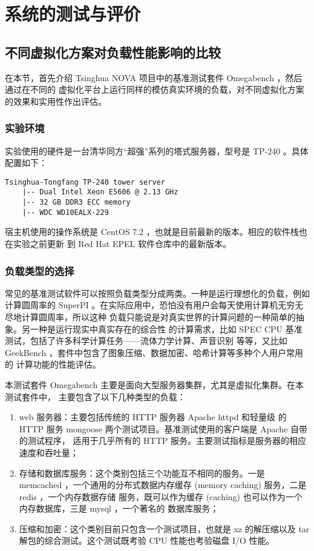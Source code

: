 \chapter{系统的测试与评价}

\section{不同虚拟化方案对负载性能影响的比较}

在本节，首先介绍 Tsinghua NOVA 项目中的基准测试套件 Omegabench ，然后通过在不同的
虚拟化平台上运行同样的模仿真实环境的负载，对不同虚拟化方案的效果和实用性作出评估。

\subsection{实验环境}

实验使用的硬件是一台清华同方“超强”系列的塔式服务器，型号是 TP-240 。具体配置如下：

\begin{lstlisting}
Tsinghua-Tongfang TP-240 tower server
    |-- Dual Intel Xeon E5606 @ 2.13 GHz
    |-- 32 GB DDR3 ECC memory
    |-- WDC WD10EALX-229
\end{lstlisting}

宿主机使用的操作系统是 CentOS 7.2 ，也就是目前最新的版本。相应的软件栈也在实验之前更新
到 Red Hat EPEL 软件仓库中的最新版本。

\subsection{负载类型的选择}

常见的基准测试软件可以按照负载类型分成两类。一种是运行理想化的负载，例如计算圆周率的
SuperPI 。在实际应用中，恐怕没有用户会每天使用计算机无穷无尽地计算圆周率，所以这种
负载只能说是对真实世界的计算问题的一种简单的抽象。另一种是运行现实中真实存在的综合性
的计算需求，比如 SPEC CPU 基准测试，包括了许多科学计算任务——流体力学计算、声音识别
等等，又比如 GeekBench ，套件中包含了图象压缩、数据加密、哈希计算等多种个人用户常用的
计算功能的性能评估。

本测试套件 Omegabench 主要是面向大型服务器集群，尤其是虚拟化集群。在本测试套件中，
主要包含了以下几种类型的负载：

\begin{enumerate}
    \item web 服务器：主要包括传统的 HTTP 服务器 Apache httpd 和轻量级
    的 HTTP 服务 mongoose 两个测试项目。基准测试使用的客户端是 Apache 自带的测试程序，
    适用于几乎所有的 HTTP 服务。主要测试指标是服务器的相应速度和吞吐量；
    \item 存储和数据库服务：这个类别包括三个功能互不相同的服务。一是 memcached
    ，一个通用的分布式数据内存缓存 (memory caching) 服务，二是 redis ，一个内存数据存储
    服务，既可以作为缓存 (caching) 也可以作为一个内存数据库，三是 mysql ，一个著名的
    数据库服务；
    \item 压缩和加密：这个类别目前只包含一个测试项目，也就是 xz 的解压缩以及
    tar 解包的综合测试。这个测试既考验 CPU 性能也考验磁盘 I/O 性能。
\end{enumerate}

